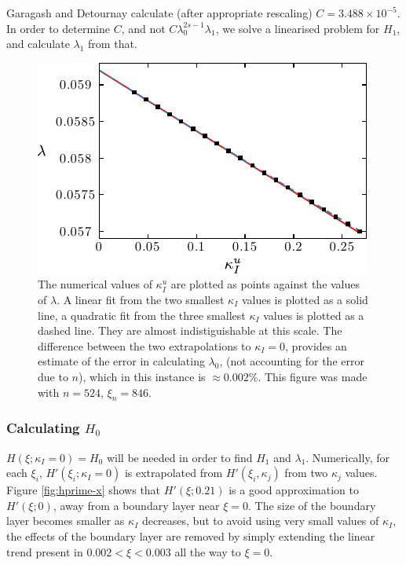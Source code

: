 \documentclass{jfm}
\begin{document}
Garagash and Detournay calculate (after appropriate rescaling) 
$C = 3.488 \times 10^{-5}$. In order to determine $C$, and not 
$C\lambda_0^{2s-1}\lambda_1$, we solve a linearised problem for $H_1$, and 
calculate $\lambda_1$ from that.
\begin{figure}
  \centerline{\includegraphics{./../../Graphs/l0-edited.pdf}}
  \caption{The numerical values of $\kappa_I^u$ are plotted as points against
           the values of $\lambda$. A linear fit from the two smallest 
           $\kappa_I$ values is plotted as a solid line, a quadratic fit from 
           the three smallest $\kappa_I$ values is plotted as a dashed line.
           They are almost indistiguishable at this scale. The difference 
           between the two extrapolations to $\kappa_I=0$,  provides an 
           estimate of the error in calculating $\lambda_0$, (not accounting 
           for the error due to $n$), which in this instance is 
           $\approx 0.002\%$. This figure was made with $n=524$, $\xi_n=846$. 
           }\label{fig:l0}
\end{figure}
%
\subsubsection{Calculating $H_0$ }
$H(\xi ; \kappa_I=0) = H_0$ will be needed in order to find $H_1$ and 
$\lambda_1$. Numerically, for each $\xi_i$, $H'(\xi_i; \kappa_I = 0)$ is 
extrapolated from $H'(\xi_i, \kappa_j)$ from two $\kappa_j$ values. Figure 
\ref{fig:hprime-x} shows that $H'(\xi; 0.21)$ is a good approximation to 
$H'(\xi;0)$, away from a boundary layer near $\xi=0$. The size of the boundary 
layer becomes smaller as $\kappa_I$ decreases, but to avoid using very small 
values of $\kappa_I$, the effects of the boundary layer are removed by simply 
extending the linear trend present in $0.002 < \xi < 0.003$ all the way to 
$\xi=0$.
%
%
\end{document}

